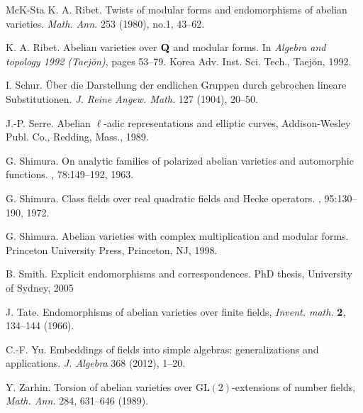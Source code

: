 \documentclass[oneside]{amsart}
\theoremstyle{remark}
\newcommand{\GL}{\mathrm{GL}}
\numberwithin{equation}{section}
\begin{document}
\begin{thebibliography}{McK-Sta}
 K. A. Ribet. 
\newblock Twists of modular forms and endomorphisms of abelian varieties. {\em Math. Ann.} 253 (1980), no.1, 43--62.


K. A. Ribet.
\newblock Abelian varieties over {${\bf Q}$} and modular forms.
\newblock In {\em Algebra and topology 1992 ({T}aej\u on)}, pages 53--79. Korea Adv. Inst. Sci. Tech., Taej\u on, 1992.

 I. Schur. 
\newblock Über die Darstellung der endlichen Gruppen durch gebrochen lineare Substitutionen. {\em J. Reine Angew. Math.} 127 (1904), 20--50.

 J.-P. Serre. 
\newblock Abelian $\ell$-adic representations and elliptic curves, Addison-Wesley Publ. Co., Redding, Mass., 1989.

G. Shimura.
\newblock On analytic families of polarized abelian varieties and automorphic
  functions.
, 78:149--192, 1963.

G. Shimura.
\newblock Class fields over real quadratic fields and {H}ecke operators.
, 95:130--190, 1972.

 G. Shimura. 
\newblock Abelian varieties with complex multiplication and modular forms. 
\newblock Princeton University Press, Princeton, NJ, 1998.

 B. Smith.
  \newblock Explicit endomorphisms and correspondences.
  \newblock PhD thesis, University of Sydney, 2005

 J. Tate. 
\newblock Endomorphisms of abelian varieties over finite fields, 
\newblock \emph{Invent. math.} \textbf{2}, 134--144 (1966).


C.-F. Yu.
\newblock Embeddings of fields into simple algebras: generalizations and applications. {\em J. Algebra} 368 (2012), 1--20.


Y. Zarhin. 
\newblock Torsion of abelian varieties over $\GL(2)$-extensions of number fields, {\em Math. Ann.} 284, 631--646 (1989).

\end{thebibliography}
\end{document}
